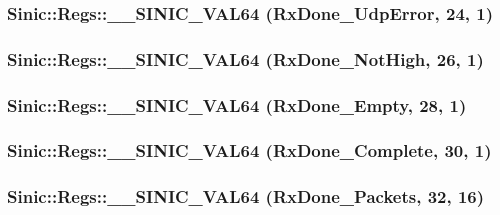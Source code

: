 \label{namespaceSinic_1_1Regs_a9dfc142d1cf5dd6b3e90c3ce59473f0e}
\hypertarget{namespaceSinic_1_1Regs_acd705231133b1770ca6bb2832b91c188}{
\subsubsection[{\_\-\_\-SINIC\_\-VAL64}]{\setlength{\rightskip}{0pt plus 5cm}Sinic::Regs::\_\-\_\-SINIC\_\-VAL64 (RxDone\_\-UdpError, \/  24, \/  1)}}
\label{namespaceSinic_1_1Regs_acd705231133b1770ca6bb2832b91c188}
\hypertarget{namespaceSinic_1_1Regs_af182b1b9bf70733427ca5de5c279065a}{
\subsubsection[{\_\-\_\-SINIC\_\-VAL64}]{\setlength{\rightskip}{0pt plus 5cm}Sinic::Regs::\_\-\_\-SINIC\_\-VAL64 (RxDone\_\-NotHigh, \/  26, \/  1)}}
\label{namespaceSinic_1_1Regs_af182b1b9bf70733427ca5de5c279065a}
\hypertarget{namespaceSinic_1_1Regs_aa4d447d12bad07ba3285284641f0b9bd}{
\subsubsection[{\_\-\_\-SINIC\_\-VAL64}]{\setlength{\rightskip}{0pt plus 5cm}Sinic::Regs::\_\-\_\-SINIC\_\-VAL64 (RxDone\_\-Empty, \/  28, \/  1)}}
\label{namespaceSinic_1_1Regs_aa4d447d12bad07ba3285284641f0b9bd}
\hypertarget{namespaceSinic_1_1Regs_ac2d50c9bbacebbb88c7e3ce8f5bfe332}{
\subsubsection[{\_\-\_\-SINIC\_\-VAL64}]{\setlength{\rightskip}{0pt plus 5cm}Sinic::Regs::\_\-\_\-SINIC\_\-VAL64 (RxDone\_\-Complete, \/  30, \/  1)}}
\label{namespaceSinic_1_1Regs_ac2d50c9bbacebbb88c7e3ce8f5bfe332}
\hypertarget{namespaceSinic_1_1Regs_a3bc0e3717e900c96e4f8aace95a88ef0}{
\subsubsection[{\_\-\_\-SINIC\_\-VAL64}]{\setlength{\rightskip}{0pt plus 5cm}Sinic::Regs::\_\-\_\-SINIC\_\-VAL64 (RxDone\_\-Packets, \/  32, \/  16)}}
